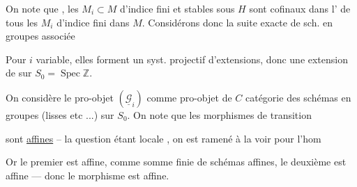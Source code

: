 

On note que ,
 les $M_i\subset M$ d'indice fini et stables sous $H$
sont cofinaux dans l' de tous les $M_i$ d'indice fini dans
$M$. Considérons donc la suite exacte de sch. en groupes associée



Pour $i$ variable, elles forment un syst. projectif d'extensions,
donc une extension de  sur $S_0=\operatorname{Spec}\mathbb Z$.



On considère le pro-objet $(\underline{\mathcal G}_i)$ comme pro-objet
de $C$ catégorie des schémas en groupes (lisses etc ...) sur $S_0$.
On note que les morphismes de transition


sont \uline{affines} -- la question étant locale
, on est ramené à la voir pour
l'hom





Or le premier est affine, comme somme finie de schémas affines, le deuxième est affine --- donc le morphisme est affine.

